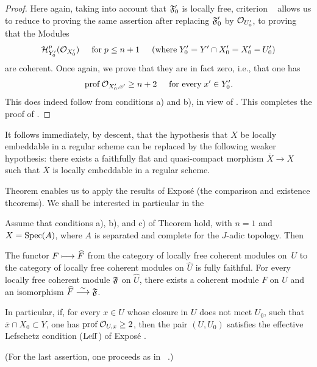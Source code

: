 \begin{proof}
\enlargethispage{\baselineskip}%
Here again, taking into account that $\mathfrak F_0'$ is locally free, criterion ~ allows us to reduce to proving the same assertion after replacing $\mathfrak F_0'$ by $\mathcal O_{U'_0}$, \ie to proving that the Modules\pageoriginale
\[
\mathcal H^p_{Y_0'}(\mathcal O_{X_0'}) \hspace{5mm} \text{for} \; p\leq n+1 \hspace{5mm} \text{(where} \; Y'_0=Y'\cap X_0'=X_0'- U'_0 \text{)}
\]
are coherent. Once again, we prove that they are in fact zero, i.e., that one has
\steco
\begin{equation} \label{eq:XII.25} {}\operatorname{prof} \mathcal O_{X'_0, x'} \geq n+2 \hspace{5mm} \text{for every} \; x'\in Y'_0.
\end{equation}
This does indeed follow from conditions a) and b), in view of . This completes the proof of .
\skipqed
\end{proof}

\begin{remarque} \label{XII.4.3}
It follows immediately, by descent, that the hypothesis that $X$ be locally embeddable in a regular scheme can be replaced by the following weaker hypothesis: there exists a faithfully flat and quasi-compact morphism $\overline{X}\to X$ such that $\overline{X}$ is locally embeddable in a regular scheme.
\end{remarque}

Theorem  enables us to apply the results of Expos\'e  (the comparison and existence theorems). We shall be interested in particular in the

\begin{corollaire} \label{XII.4.4}
Assume that conditions a), b), and c) of Theorem  hold, with $n=1$ and $X=\operatorname{Spec}(A)$, where $A$ is separated and complete for the $J$-adic topology. Then
\begin{enumerate}
\sisi{\item[\textup{1\noo})]}{\item} The functor $F\longmapsto \widehat{F}$ from the category of locally free coherent modules on~$U$ to the category of locally free coherent modules on $\widehat{U}$ is fully faithful. \sisi{\item[\textup{2\noo})]}{\item} For every locally free coherent module $\mathfrak F$ on $\widehat{U}$, there exists a coherent module $F$ on $U$ and an isomorphism $\widehat{F}\overset{\sim}{\longrightarrow} \mathfrak F$.
\end{enumerate}
In particular, if, for every $x\in U$ whose closure in $U$ does not meet $U_0$, \ie such that $\overline{x}\cap X_0\subset Y$, one has $\operatorname{prof} \mathcal O_{U, x}\geq 2$, then the pair $(U, U_0)$ satisfies the effective Lefschetz condition ($\operatorname{Leff}$) of Expos\'e .
\end{corollaire}
\noindent
(For the last assertion, one proceeds as in ~.)

